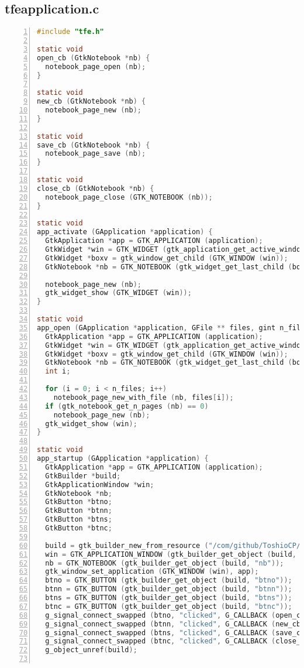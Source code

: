 \hypertarget{tfeapplication.c}{%
\subsection{tfeapplication.c}\label{tfeapplication.c}}

\begin{lstlisting}[language=C, numbers=left]
#include "tfe.h"

static void
open_cb (GtkNotebook *nb) {
  notebook_page_open (nb);
}

static void
new_cb (GtkNotebook *nb) {
  notebook_page_new (nb);
}

static void
save_cb (GtkNotebook *nb) {
  notebook_page_save (nb);
}

static void
close_cb (GtkNotebook *nb) {
  notebook_page_close (GTK_NOTEBOOK (nb));
}

static void
app_activate (GApplication *application) {
  GtkApplication *app = GTK_APPLICATION (application);
  GtkWidget *win = GTK_WIDGET (gtk_application_get_active_window (app));
  GtkWidget *boxv = gtk_window_get_child (GTK_WINDOW (win));
  GtkNotebook *nb = GTK_NOTEBOOK (gtk_widget_get_last_child (boxv));

  notebook_page_new (nb);
  gtk_widget_show (GTK_WIDGET (win));
}

static void
app_open (GApplication *application, GFile ** files, gint n_files, const gchar *hint) {
  GtkApplication *app = GTK_APPLICATION (application);
  GtkWidget *win = GTK_WIDGET (gtk_application_get_active_window (app));
  GtkWidget *boxv = gtk_window_get_child (GTK_WINDOW (win));
  GtkNotebook *nb = GTK_NOTEBOOK (gtk_widget_get_last_child (boxv));
  int i;

  for (i = 0; i < n_files; i++)
    notebook_page_new_with_file (nb, files[i]);
  if (gtk_notebook_get_n_pages (nb) == 0)
    notebook_page_new (nb);
  gtk_widget_show (win);
}

static void
app_startup (GApplication *application) {
  GtkApplication *app = GTK_APPLICATION (application);
  GtkBuilder *build;
  GtkApplicationWindow *win;
  GtkNotebook *nb;
  GtkButton *btno;
  GtkButton *btnn;
  GtkButton *btns;
  GtkButton *btnc;

  build = gtk_builder_new_from_resource ("/com/github/ToshioCP/tfe/tfe.ui");
  win = GTK_APPLICATION_WINDOW (gtk_builder_get_object (build, "win"));
  nb = GTK_NOTEBOOK (gtk_builder_get_object (build, "nb"));
  gtk_window_set_application (GTK_WINDOW (win), app);
  btno = GTK_BUTTON (gtk_builder_get_object (build, "btno"));
  btnn = GTK_BUTTON (gtk_builder_get_object (build, "btnn"));
  btns = GTK_BUTTON (gtk_builder_get_object (build, "btns"));
  btnc = GTK_BUTTON (gtk_builder_get_object (build, "btnc"));
  g_signal_connect_swapped (btno, "clicked", G_CALLBACK (open_cb), nb);
  g_signal_connect_swapped (btnn, "clicked", G_CALLBACK (new_cb), nb);
  g_signal_connect_swapped (btns, "clicked", G_CALLBACK (save_cb), nb);
  g_signal_connect_swapped (btnc, "clicked", G_CALLBACK (close_cb), nb);
  g_object_unref(build);


\end{lstlisting}
